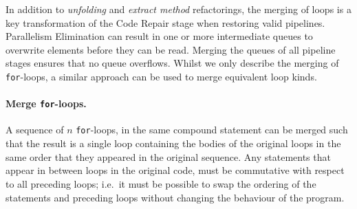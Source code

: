 In addition to \emph{unfolding} and \emph{extract method} refactorings, the merging of loops is a key transformation of the Code Repair stage when restoring valid pipelines. 
%
%
Parallelism Elimination can result in one or more intermediate queues to overwrite elements before they can be read.
%
%
Merging the queues of all pipeline stages ensures that no queue overflows.
%
%
Whilst we only describe the merging of \lstinline{for}-loops, a similar approach can be used to merge equivalent loop kinds.

%


\paragraph{Merge \lstinline{for}-loops.}

A sequence of $n$ \lstinline{for}-loops,
%
%
%
in the same compound statement can be merged such that the result is a single loop containing the bodies of the original loops in the same order that they appeared in the original sequence. Any statements that appear in between loops in the original code, must be commutative with respect to all preceding loops; i.e.\ it must be possible to swap the ordering of the statements and preceding loops without changing the behaviour of the program.

